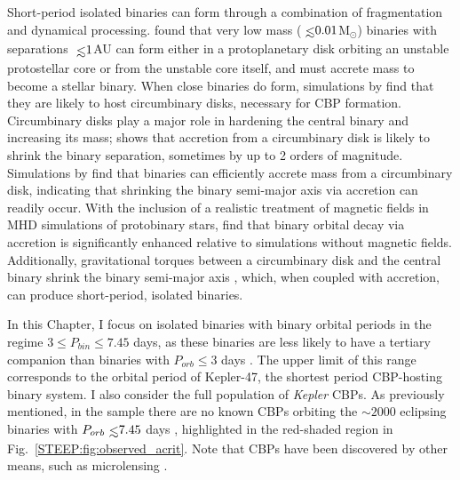 Short-period isolated binaries can form through a combination of fragmentation and dynamical processing. \citet{Bonnell1994} found that very low mass ($\lsim 0.01$M$_{\odot}$) binaries with separations $\lsim 1$AU can form either in a protoplanetary disk orbiting an unstable protostellar core or from the unstable core itself, and must accrete mass to become a stellar binary.  When close binaries do form, simulations by \citet{Bate2000} find that they are likely to host circumbinary disks, necessary for CBP formation.  Circumbinary disks play a major role in hardening the central binary and increasing its mass; \citet{Bate2000} shows that accretion from a circumbinary disk is likely to shrink the binary separation, sometimes by up to 2 orders of magnitude.  Simulations by \citet{Artymowicz1996a} find that binaries can efficiently accrete mass from a circumbinary disk, indicating that shrinking the binary semi-major axis via accretion can readily occur.  With the inclusion of a realistic treatment of magnetic fields in MHD simulations of protobinary stars, \citet{Zhao2013} find that binary orbital decay via accretion is significantly enhanced relative to simulations without magnetic fields.  Additionally, gravitational torques between a circumbinary disk and the central binary shrink the binary semi-major axis \citep[e.g.][]{Artymowicz1991,Bate2002,Armitage2005,Fleming2017}, which, when coupled with accretion, can produce short-period, isolated binaries.

In this Chapter, I focus on isolated binaries with binary orbital periods in the regime $3 \leq P_{bin} \leq 7.45 $ days, as these binaries are less likely to have a tertiary companion than binaries with $P_{orb} \leq 3$ days \citep{Tokovinin2006}.  The upper limit of this range corresponds to the orbital period of Kepler-47, the shortest period CBP-hosting binary system.  I also consider the full population of \textit{Kepler} CBPs.  As previously mentioned, in the \kepler sample there are no known CBPs orbiting the ${\sim 2000}$ eclipsing binaries with $P_{orb} \lsim 7.45$ days \citep{Kirk2016}, highlighted in the red-shaded region in Fig.~\ref{STEEP:fig:observed_acrit}.  Note that CBPs have been discovered by other means, such as microlensing \citep[e.g.][]{Bennett2016}. 


